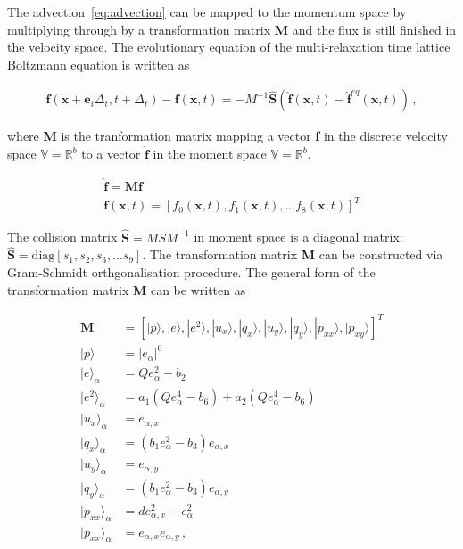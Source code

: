 \noindent The advection~\cref{eq:advection} can be mapped to the momentum 
space by multiplying through by a transformation matrix \textbf{M} and the flux 
is still finished in the velocity space. The evolutionary equation of the 
multi-relaxation time lattice Boltzmann equation is written as

\begin{gather}
\mathbf{f}(\mathbf{x}+\mathbf{e}_i\Delta_t, t+ 
\Delta_t)-\mathbf{f}(\mathbf{x},t)=-M^{-1}\hat{\mathbf{S}}(\hat{\mathbf{f}}
(\mathbf{x},t)-\hat{\mathbf{f}}^{eq}(\mathbf{x},t))\,,
\end{gather}

\noindent where \textbf{M} is the tranformation matrix mapping a vector 
\textbf{f} in the discrete velocity space $\mathds{V}=\mathds{R}^b$ to a vector 
$\hat{\mathbf{f}}$ in the moment space $\mathds{V}=\mathds{R}^b$. 

\begin{gather}
\nonumber
\hat{\mathbf{f}}= \mathbf{M}\mathbf{f} \\ 
\nonumber
\mathbf{f}(\mathbf{x},t) =\left[f_0(\mathbf{x},t),f_1(\mathbf{x},t),\dots f_8(\mathbf{x},t)\right]^T
\end{gather}

The collision matrix $\hat{\mathbf{S}} = MSM^{-1}$ in moment space is a 
diagonal matrix: $\hat{\mathbf{S}} =\mbox{diag} \left[ s_1, s_2, s_3,\dots s_9  
\right]$. The transformation matrix \textbf{M} can be constructed via 
Gram-Schmidt orthgonalisation procedure. The general form of the transformation 
matrix \textbf{M} can be written as

\begin{align}
\mathbf{M} & =  
\left[|p\rangle,|e\rangle,|e^2\rangle,|u_x\rangle,|q_x\rangle,|u_y\rangle,
			|q_y\rangle,|p_{xx}\rangle,|p_{xy}\rangle\right]^T \\
|p\rangle & =  |\mathit{e}_{\alpha}|^0\\
|e\rangle_{\alpha} & = \mathit{Q}e_{\alpha}^2-b_2\\
|e^2\rangle_{\alpha} & =  	
		a_1(\mathit{Q}e_{\alpha}^4-b_6)+a_2(\mathit{Q}e_{\alpha}^4-b_6)\\
|u_x\rangle_{\alpha} & = e_{\alpha,x} \\
|q_x\rangle_{\alpha} & = (\mathit{b}_1e_{\alpha}^2-b_3)e_{\alpha,x}\\
|u_y\rangle_{\alpha} & = e_{\alpha,y}\\
|q_y\rangle_{\alpha} & = (\mathit{b}_1e_{\alpha}^2-b_3)e_{\alpha,y}\\
|p_{xx}\rangle_{\alpha} & = \mathit{d}e_{\alpha,x}^2-e_{\alpha}^2\\
|p_{xx}\rangle_{\alpha}  & = e_{\alpha,x}e_{\alpha,y} \,,
\end{align}

